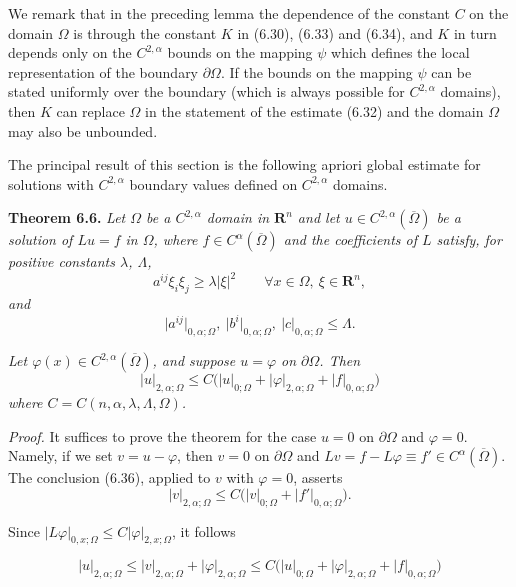 We remark that in the preceding lemma the dependence of the constant \(C\) on the domain \(\Omega\) is through the constant \(K\) in (6.30), (6.33) and (6.34), and \(K\) in turn depends only on the \(C^{2,\alpha}\) bounds on the mapping \(\psi\) which defines the local representation of the boundary \(\partial\Omega\). If the bounds on the mapping \(\psi\) can be stated uniformly over the boundary (which is always possible for \(C^{2,\alpha}\) domains), then \(K\) can replace \(\Omega\) in the statement of the estimate (6.32) and the domain \(\Omega\) may also be unbounded.

The principal result of this section is the following apriori global estimate for solutions with \(C^{2,\alpha}\) boundary values defined on \(C^{2,\alpha}\) domains.

\textbf{Theorem 6.6.} \emph{Let \(\Omega\) be a \(C^{2,\alpha}\) domain in \(\mathbf{R}^n\) and let \(u\in C^{2,\alpha}(\overline{\Omega})\) be a solution of \(Lu=f\) in \(\Omega\), where \(f\in C^\alpha(\overline{\Omega})\) and the coefficients of \(L\) satisfy, for positive constants \(\lambda\), \(\Lambda\),}
\[
a^{ij}\xi_i\xi_j\ge \lambda\lvert\xi\rvert^2 \qquad \forall x\in\Omega,\ \xi\in\mathbf{R}^n,
\]
\emph{and}
\[
\lvert a^{ij}\rvert_{0,\alpha;\Omega},\ \lvert b^i\rvert_{0,\alpha;\Omega},\ \lvert c\rvert_{0,\alpha;\Omega}\le \Lambda.
\]

\emph{Let \(\varphi(x)\in C^{2,\alpha}(\overline{\Omega})\), and suppose \(u=\varphi\) on \(\partial\Omega\). Then}
\[
\tag{6.36}
\lvert u\rvert_{2,\alpha;\Omega}\le C\bigl(\lvert u\rvert_{0;\Omega}+\lvert \varphi\rvert_{2,\alpha;\Omega}+\lvert f\rvert_{0,\alpha;\Omega}\bigr)
\]
\emph{where \(C=C(n,\alpha,\lambda,\Lambda,\Omega)\).}

\emph{Proof.} It suffices to prove the theorem for the case \(u=0\) on \(\partial\Omega\) and \(\varphi=0\). Namely, if we set \(v=u-\varphi\), then \(v=0\) on \(\partial\Omega\) and \(Lv=f-L\varphi\equiv f'\in C^\alpha(\overline{\Omega})\). The conclusion (6.36), applied to \(v\) with \(\varphi=0\), asserts
\[
\lvert v\rvert_{2,\alpha;\Omega}\le C\bigl(\lvert v\rvert_{0;\Omega}+\lvert f'\rvert_{0,\alpha;\Omega}\bigr).
\]




Since $|L\varphi|_{0,x;\Omega}\le C|\varphi|_{2,x;\Omega}$, it follows

\[
|u|_{2,\alpha;\Omega}\le |v|_{2,\alpha;\Omega}+|\varphi|_{2,\alpha;\Omega}\le C\bigl(|u|_{0;\Omega}+|\varphi|_{2,\alpha;\Omega}+|f|_{0,\alpha;\Omega}\bigr)
\]

